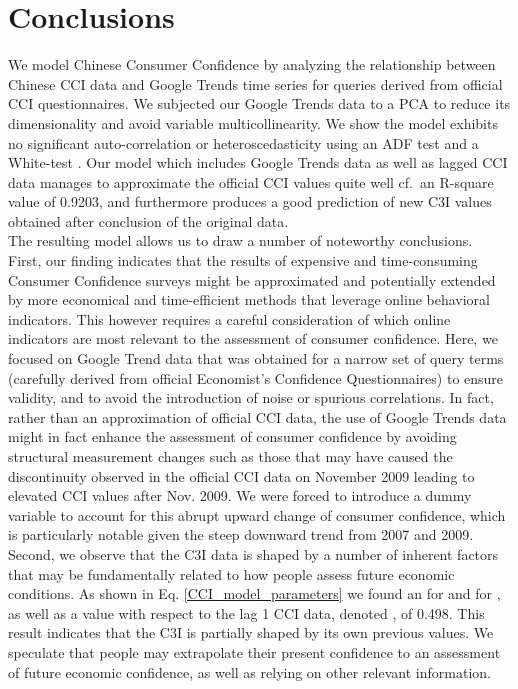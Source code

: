 \documentclass[10pt]{article}
\begin{document}
\section*{Conclusions}
We model Chinese Consumer Confidence by analyzing the relationship between Chinese CCI data and Google Trends time series for queries derived from official CCI questionnaires. We subjected our Google Trends data to a PCA to reduce its dimensionality and avoid variable multicollinearity. We show the model exhibits no significant auto-correlation or heteroscedasticity using an ADF test and a White-test \cite{White1980}. Our model which includes Google Trends data as well as lagged CCI data manages to approximate the official CCI values quite well cf.~an R-square value of 0.9203, and furthermore produces a good prediction of new C3I values obtained after conclusion of the original data.\\

The resulting model allows us to draw a number of noteworthy conclusions.\\

First, our finding indicates that the results of expensive and time-consuming Consumer Confidence surveys might be approximated and potentially extended by more economical and time-efficient methods that leverage online behavioral indicators. This however requires a careful consideration of which online indicators are most relevant to the assessment of consumer confidence. Here, we focused on Google Trend data that was obtained for a narrow set of query terms (carefully derived from official Economist's Confidence Questionnaires) to ensure validity, and to avoid the introduction of noise or spurious correlations. In fact, rather than an approximation of official CCI data, the use of Google Trends data might in fact enhance the assessment of consumer confidence by avoiding structural measurement changes such as those that may have caused the discontinuity observed in the official CCI data on November 2009 leading to elevated CCI values after Nov. 2009. We were forced to introduce a dummy variable to account for this abrupt upward change of consumer confidence, which is particularly notable given the steep downward trend from 2007 and 2009.\\

Second, we observe that the C3I data is shaped by a number of inherent factors that may be fundamentally related to how people assess future economic conditions. As shown in Eq. \ref{CCI_model_parameters} we found an  for  and 
 for , as well as a  value with respect to the lag 1 CCI data, denoted , of 0.498. This result indicates that the C3I is partially shaped by its own previous values. We speculate that people may extrapolate their present confidence to an assessment of future economic confidence, as well as relying on other relevant information.\\
\end{document}
